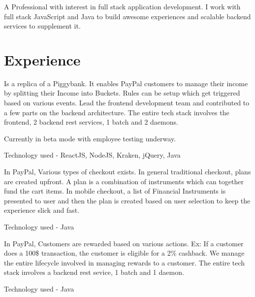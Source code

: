 \documentclass[]{deedy-resume-openfont}
\begin{document}
\begin{minipage}[t]{0.66\textwidth} 

\subsubsection*{}
A Professional with interest in full stack application development. I work with full stack JavaScript and Java to
build awesome experiences and scalable backend services to supplement it.
\section{Experience}

\vspace{\topsep}
 Is a replica of a Piggybank. It enables PayPal customers to manage their income by splitting their Income into Buckets. Rules can be setup which get triggered based on various events.  Lead the frontend development team and contributed to a few parts on the backend architecture. The entire tech stack involves the frontend, 2 backend rest services, 1 batch and 2 daemons.\begin{tightemize}
\vspace{\topsep}
\item Currently in beta mode with employee testing underway.
\item Technology used - ReactJS, NodeJS, Kraken, jQuery, Java
\end{tightemize}
\vspace{\topsep}

 In PayPal, Various types of checkout exists. In general traditional checkout, plans are created upfront. A plan is a combination of instruments which can together fund the cart items. In mobile checkout, a list of Financial Instruments is presented to user and then the plan is created based on user selection to keep the experience slick and fast. \begin{tightemize}
\item Technology used - Java
\end{tightemize}
\vspace{\topsep}

 In PayPal, Customers are rewarded based on various actions. Ex: If a customer does a 100\$ transaction, the customer is eligible for a 2\% cashback.  We manage the entire lifecycle involved in managing rewards to a customer. The entire tech stack involves a backend rest sevice, 1 batch and 1 daemon.\begin{tightemize}
\item Technology used - Java
\end{tightemize}
\vspace{\topsep}


\end{minipage}
\end{document}
